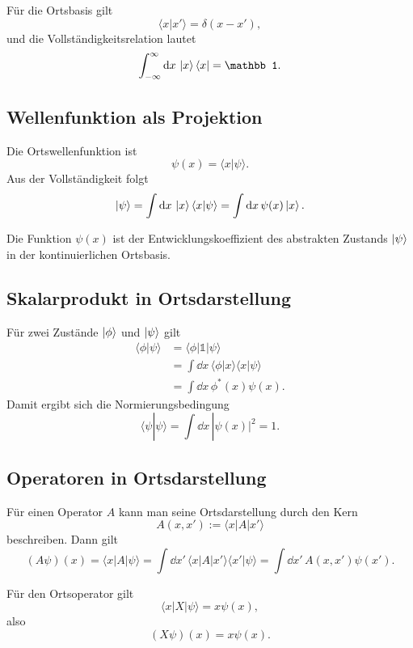 \begin{formulabox}
Für die Ortsbasis gilt
\[
    \langle x|x'\rangle=\delta(x-x'),
\]
und die Vollständigkeitsrelation lautet
\[
    \int_{-\infty}^{\infty}\dd x\,\ket{x}\bra{x}=\mathbb 1.
\]
\end{formulabox}

\subsection{Wellenfunktion als Projektion}

Die Ortswellenfunktion ist
\[
    \psi(x)=\langle x|\psi\rangle.
\]
Aus der Vollständigkeit folgt
\[
    \left|\psi\right\rangle=\int\mathrm{d} x\,\left|x\right\rangle\langle x|\psi\rangle
    =\int\mathrm{d} x\,\psi(x)\left|x\right\rangle.
\]

\begin{conceptbox}
Die Funktion $\psi(x)$ ist der Entwicklungskoeffizient des abstrakten Zustands $\left|\psi\right\rangle$ in der kontinuierlichen Ortsbasis.
\end{conceptbox}

\subsection{Skalarprodukt in Ortsdarstellung}

Für zwei Zustände $\left|\phi\right\rangle$ und $\left|\psi\right\rangle$ gilt
\[
\begin{aligned}
    \langle\phi|\psi\rangle
    &=\langle\phi|\mathbb 1|\psi\rangle \\
    &=\int\dd x\,\langle\phi|x\rangle\langle x|\psi\rangle \\
    &=\int\dd x\,\phi^*(x)\psi(x).
\end{aligned}
\]
Damit ergibt sich die Normierungsbedingung
\[
    \langle\psi|\psi\rangle
    =\int\dd x\,|\psi(x)|^2=1.
\]

\subsection{Operatoren in Ortsdarstellung}

Für einen Operator $A$ kann man seine Ortsdarstellung durch den Kern
\[
    A(x,x'):=\langle x|A|x'\rangle
\]
beschreiben. Dann gilt
\[
    (A\psi)(x)=\langle x|A|\psi\rangle
    =\int\dd x'\,\langle x|A|x'\rangle\langle x'|\psi\rangle
    =\int\dd x'\,A(x,x')\psi(x').
\]

Für den Ortsoperator gilt
\[
    \langle x|X|\psi\rangle=x\psi(x),
\]
also
\[
    (X\psi)(x)=x\psi(x).
\]

